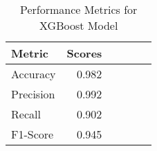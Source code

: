 \begin{table}[H]\centering
\caption{Performance Metrics for XGBoost Model}
\label{Table 1 :performance_metrics}
\begin{tabular}{lrrrrr}
\toprule
Metric & Scores \\
\midrule
Accuracy & 0.982 \\
Precision & 0.992 \\
Recall & 0.902 \\
F1-Score & 0.945 \\
\bottomrule
\end{tabular}
\end{table}
